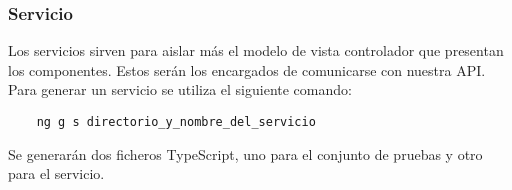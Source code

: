 \subsubsection{Servicio}
Los servicios \cite{angular-services} sirven para aislar más el modelo de vista controlador que presentan los componentes. Estos serán los encargados de comunicarse con nuestra API.
\\Para generar un servicio se utiliza el siguiente comando:
\begin{verbatim}
    ng g s directorio_y_nombre_del_servicio
\end{verbatim}
Se generarán dos ficheros TypeScript, uno para el conjunto de pruebas y otro para el servicio.